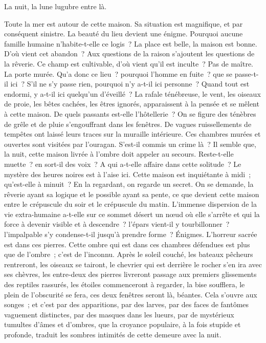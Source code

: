 \documentclass[french,twoside]{book} %
\begin{document}
La nuit, la lune lugubre entre là.\par
Toute la mer est autour de cette maison. Sa situation est magnifique, et par conséquent sinistre. La beauté du lieu devient une énigme. Pourquoi aucune famille humaine n’habite-t-elle ce logis ? La place est belle, la maison est bonne. D’où vient cet abandon ? Aux questions de la raison s’ajoutent les questions de  la rêverie. Ce champ est cultivable, d’où vient qu’il est inculte ? Pas de maître. La porte murée. Qu’a donc ce lieu ? pourquoi l’homme en fuite ? que se passe-t-il ici ? S’il ne s’y passe rien, pourquoi n’y a-t-il ici personne ? Quand tout est endormi, y a-t-il ici quelqu’un d’éveillé ? La rafale ténébreuse, le vent, les oiseaux de proie, les bêtes cachées, les êtres ignorés, apparaissent à la pensée et se mêlent à cette maison. De quels passants est-elle l’hôtellerie ? On se figure des ténèbres de grêle et de pluie s’engouffrant dans les fenêtres. De vagues ruissellements de tempêtes ont laissé leurs traces sur la muraille intérieure. Ces chambres murées et ouvertes sont visitées par l’ouragan. S’est-il commis un crime là ? Il semble que, la nuit, cette maison livrée à l’ombre doit appeler au secours. Reste-t-elle muette ? en sort-il des voix ? A qui a-t-elle affaire dans cette solitude ? Le mystère des heures noires est à l’aise ici. Cette maison est inquiétante à midi ; qu’est-elle à minuit ? En la regardant, on regarde un secret. On se demande, la rêverie ayant sa logique et le possible ayant sa pente, ce que devient cette maison entre le crépuscule du soir et le crépuscule du matin. L’immense dispersion de la vie extra-humaine a-t-elle sur ce sommet désert un nœud où elle s’arrête et qui la force à devenir visible et à descendre ? l’épars vient-il y tourbillonner ? l’impalpable s’y condense-t-il jusqu’à prendre forme ? Énigmes. L’horreur sacrée est dans ces pierres. Cette ombre qui est dans ces chambres défendues est plus que de l’ombre ; c’est de l’inconnu. Après le soleil couché, les bateaux pêcheurs  rentreront, les oiseaux se tairont, le chevrier qui est derrière le rocher s’en ira avec ses chèvres, les entre-deux des pierres livreront passage aux premiers glissements des reptiles rassurés, les étoiles commenceront à regarder, la bise soufflera, le plein de l’obscurité se fera, ces deux fenêtres seront là, béantes. Cela s’ouvre aux songes ; et c’est par des apparitions, par des larves, par des faces de fantômes vaguement distinctes, par des masques dans les lueurs, par de mystérieux tumultes d’âmes et d’ombres, que la croyance populaire, à la fois stupide et profonde, traduit les sombres intimités de cette demeure avec la nuit.\par
\end{document}
